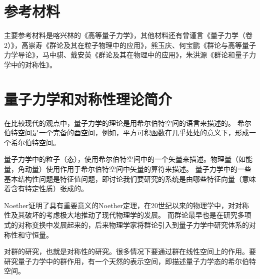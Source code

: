 \newcommand{\HamiltonionOperator}{\ensuremath{\hat{H}}}
\newcommand{\sutwo}{\ensuremath{SU(2)}}
\newcommand{\sothree}{\ensuremath{SO(3)}}
\newcommand{\mpr}{\ensuremath{{m^{\prime}}}}
\newcommand{\vpp}{\ensuremath{\vert\uparrow\rangle}}
\newcommand{\vmm}{\ensuremath{\vert\downarrow\rangle}}


\section*{参考材料}
主要参考材料是喀兴林的《高等量子力学》，其他材料还有曾谨言《量子力学（卷2）》，高崇寿《群论及其在粒子物理中的应用》，熊玉庆、何宝鹏《群论与高等量子力学导论》，马中骐、戴安英《群论及其在物理中的应用》，朱洪源《群论和量子力学中的对称性》。

\section{量子力学和对称性理论简介}
在比较现代的观点中，量子力学的理论是用希尔伯特空间的语言来描述的。
希尔伯特空间是一个完备的酉空间，例如，平方可积函数在几乎处处的意义下，形成一个希尔伯特空间。

量子力学中的粒子（态），使用希尔伯特空间中的一个矢量来描述。物理量（如能量，角动量）使用作用于希尔伯特空间中矢量的算符来描述。
量子力学中的一些基本结构性问题是特征值问题，即讨论我们要研究的系统是由哪些特征向量（意味着含有特定性质）张成的。

Noether证明了具有重要意义的Noether定理，在20世纪以来的物理学中，对对称性及其破坏的考虑极大地推动了现代物理学的发展。
而群论最早也是在研究多项式的对称变换中发展起来的，后来物理学家将群论引入到量子力学中研究体系的对称性和守恒量。

对群的研究，也就是对称性的研究。很多情况下要通过群在线性空间上的作用。要研究量子力学中的群作用，有一个天然的表示空间，即描述量子力学态的希尔伯特空间。


